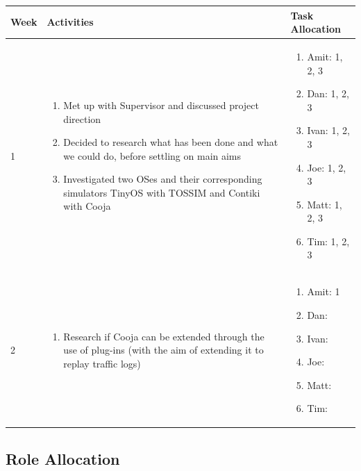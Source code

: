 \documentclass[a4paper]{article}
\begin{document}
\begin{table}[H]
	\centering
	\begin{tabular}{| l | p{6cm} | p{6cm} |}
	Week & Activities & Task Allocation\\
	\hline
	1 & \begin{enumerate}
			\item Met up with Supervisor and discussed project direction
			\item Decided to research what has been done and what we could do, before settling on main aims
			\item Investigated two OSes and their corresponding simulators TinyOS with TOSSIM and Contiki with Cooja
		\end{enumerate} &
	\begin{enumerate}
		\item[] Amit: 1, 2, 3
		\item[] Dan: 1, 2, 3
		\item[] Ivan: 1, 2, 3
		\item[] Joe: 1, 2, 3
		\item[] Matt: 1, 2, 3
		\item[] Tim: 1, 2, 3
	\end{enumerate}
	\\ \hline

	2 & \begin{enumerate}
			\item Research if Cooja can be extended through the use of plug-ins (with the aim of extending it to replay traffic logs)
		\end{enumerate} &
	\begin{enumerate}
		\item[] Amit: 1
		\item[] Dan: ~
		\item[] Ivan: ~
		\item[] Joe: ~
		\item[] Matt: ~
		\item[] Tim: ~
	\end{enumerate}
	\\ \hline

	\end{tabular}
\end{table}

\subsection{Role Allocation}
\end{document}
